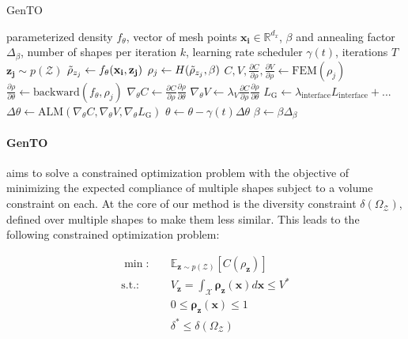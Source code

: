 \begin{algorithm}[tb]
   \caption{GenTO}
   \label{alg:GenTO}
\begin{algorithmic}
   parameterized density $f_\theta$, 
   vector of mesh points $\mathbf{x_i} \in \mathbb{R}^{d_x}$,
   $\beta$ and annealing factor $\Delta_\beta$,
   number of shapes per iteration $k$,
   learning rate scheduler $\gamma(t)$,
   iterations $T$
   \STATE $\mathbf{z_j} \sim p(\mathcal{Z})$ \hfill{}
   \STATE $\Tilde{\rho}_{z_j} \leftarrow f_\theta(\mathbf{x_i}, \mathbf{z_j})$  \hfill{}
   \STATE $\rho_j \leftarrow H(\Tilde{\rho}_{z_j}, \beta)$ \hfill{}
   \STATE $C, V, \frac{\partial C}{\partial \rho}, \frac{\partial V}{\partial \rho} \leftarrow \text{FEM}(\rho_j)$ \hfill{}
   \STATE $\frac{\partial \rho}{\partial \theta} \leftarrow \text{backward}(f_\theta, \rho_j)$ \hfill{}
   \STATE $\nabla_\theta C \leftarrow \frac{\partial C}{\partial \rho} \frac{\partial \rho}{\partial \theta} $ \hfill{}
    \STATE $\nabla_\theta V \leftarrow \lambda_V \frac{\partial C}{\partial \rho} \frac{\partial \rho}{\partial \theta} $ \hfill{}
   \STATE $L_\text{G} \leftarrow \lambda_\text{interface} L_\text{interface} + ...$ \ \hfill{}
   \STATE $\Delta \theta \leftarrow  \text{ALM} \left( \nabla_\theta C, \nabla_\theta V, \nabla_\theta L_\text{G} \right) $ \hfill{}
   \STATE $\theta \leftarrow \theta - \gamma(t) \Delta \theta $ \hfill{}
   \STATE $\beta \leftarrow \beta \Delta_\beta$ \hfill{}
   \ENDFOR
\end{algorithmic}
\end{algorithm}

\paragraph{GenTO}
aims to solve a constrained optimization problem with the objective of minimizing the expected compliance of multiple shapes subject to a volume constraint on each.
At the core of our method is the diversity constraint $\delta(\Omega_\mathcal{Z})$, defined over multiple shapes to make them less similar. This leads to the following constrained optimization problem:

\begin{equation}
\begin{aligned}
\label{eq:GenTo}
\min : & \quad \mathbb{E}_{\mathbf{z} \sim p(\mathcal{Z})} \left[ C(\rho_{\mathbf{z}}) \right]
\\
\text{s.t.} : & \quad V_{\mathbf{z}} = \int_\mathcal{X} \mathbf{\rho}_{\mathbf{z}}(\mathbf{x}) d\mathbf{x} \leq V^*\\
& \quad 0 \leq \mathbf{\rho}_{\mathbf{z}}(\mathbf{x}) \leq 1 \\
& \quad \delta^* \leq \delta(\Omega_\mathcal{Z})
\end{aligned}
\end{equation}

